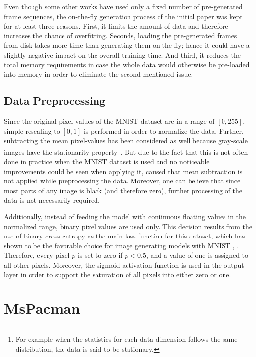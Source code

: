 Even though some other works have used only a fixed number of pre-generated frame sequences, the on-the-fly generation process of the initial paper was kept for at least three reasons. First, it limits the amount of data and therefore increases the chance of overfitting. Seconds, loading the pre-generated frames from disk takes more time than generating them on the fly; hence it could have a slightly negative impact on the overall training time. And third, it reduces the total memory requirements in case the whole data would otherwise be pre-loaded into memory in order to eliminate the second mentioned issue.

\subsection{Data Preprocessing}

Since the original pixel values of the MNIST dataset are in a range of $[0, 255]$, simple rescaling to $[0, 1]$ is performed in order to normalize the data. Further, subtracting the mean pixel-values has been considered as well because gray-scale images have the stationarity property\footnote{For example when the statistics for each data dimension follows the same distribution, the data is said to be stationary.}. But due to the fact that this is not often done in practice when the MNIST dataset is used \parencite{stanford_data_pre} and no noticeable improvements could be seen when applying it, caused that mean subtraction is not applied while preprocessing the data. Moreover, one can believe that since most parts of any image is black (and therefore zero), further processing of the data is not necessarily required.

Additionally, instead of feeding the model with continuous floating values in the normalized range, binary pixel values are used only. This decision results from the use of binary cross-entropy as the main loss function for this dataset, which has shown to be the favorable choice for image generating models with MNIST \parencite{unsup_learn_lstm}, \parencite{conv_lstm_nowcasting}. Therefore, every pixel $p$ is set to zero if $p < \num{0.5} $, and a value of one is assigned to all other pixels. Moreover, the sigmoid activation function is used in the output layer in order to support the saturation of all pixels into either zero or one.

\section{MsPacman} \label{sec:ds_pac}

